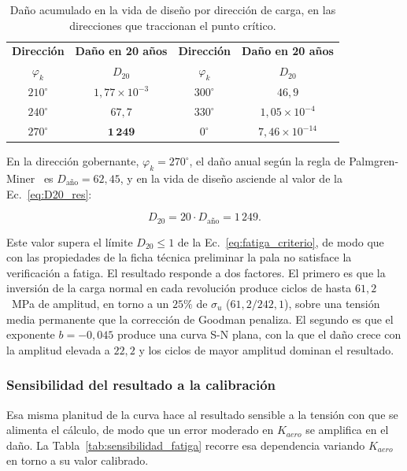 \begin{table}[H]
    \centering
    \caption{Daño acumulado en la vida de diseño por dirección de carga, en las direcciones que traccionan el punto crítico.}
    \label{tab:dano_direcciones}
    \begin{tabular}{cccc}
        \hline
        \textbf{Dirección} & \textbf{Daño en 20 años} & \textbf{Dirección} & \textbf{Daño en 20 años} \\
        $\varphi_k$ & $D_{20}$ & $\varphi_k$ & $D_{20}$ \\
        \hline
        $210^\circ$ & $1{,}77 \times 10^{-3}$ & $300^\circ$ & $46{,}9$ \\
        $240^\circ$ & $67{,}7$                & $330^\circ$ & $1{,}05 \times 10^{-4}$ \\
        $270^\circ$ & $\mathbf{1\,249}$       & $0^\circ$   & $7{,}46 \times 10^{-14}$ \\
        \hline
    \end{tabular}
\end{table}

En la dirección gobernante, $\varphi_k = 270^\circ$, el daño anual según la regla de Palmgren-Miner~\parencite{Miner1945} es $D_{\text{año}} = 62{,}45$, y en la vida de diseño asciende al valor de la Ec.~\ref{eq:D20_res}:

\begin{equation}
    D_{20} = 20 \cdot D_{\text{año}} = 1\,249.
    \label{eq:D20_res}
\end{equation}

Este valor supera el límite $D_{20} \leq 1$ de la Ec.~\ref{eq:fatiga_criterio}, de modo que con las propiedades de la ficha técnica preliminar la pala no satisface la verificación a fatiga. El resultado responde a dos factores. El primero es que la inversión de la carga normal en cada revolución produce ciclos de hasta $61{,}2$~MPa de amplitud, en torno a un $25\%$ de $\sigma_u$ ($61{,}2/242{,}1$), sobre una tensión media permanente que la corrección de Goodman penaliza. El segundo es que el exponente $b = -0{,}045$ produce una curva S-N plana, con la que el daño crece con la amplitud elevada a $22{,}2$ y los ciclos de mayor amplitud dominan el resultado.

\subsubsection{Sensibilidad del resultado a la calibración}
\label{sec:sensibilidad_fatiga}

Esa misma planitud de la curva hace al resultado sensible a la tensión con que se alimenta el cálculo, de modo que un error moderado en $K_{aero}$ se amplifica en el daño. La Tabla~\ref{tab:sensibilidad_fatiga} recorre esa dependencia variando $K_{aero}$ en torno a su valor calibrado.

